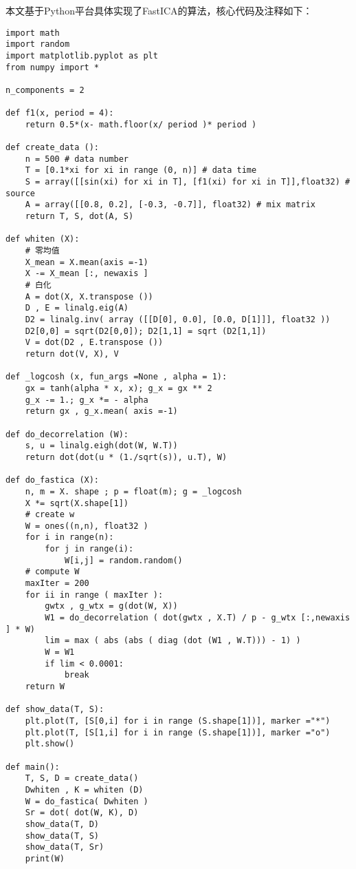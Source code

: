 本文基于Python平台具体实现了FastICA的算法，核心代码及注释如下：

\begin{verbatim}
import math
import random
import matplotlib.pyplot as plt
from numpy import *

n_components = 2

def f1(x, period = 4):
    return 0.5*(x- math.floor(x/ period )* period )

def create_data ():
    n = 500 # data number
    T = [0.1*xi for xi in range (0, n)] # data time
    S = array([[sin(xi) for xi in T], [f1(xi) for xi in T]],float32) # source
    A = array([[0.8, 0.2], [-0.3, -0.7]], float32) # mix matrix
    return T, S, dot(A, S)

def whiten (X):
    # 零均值
    X_mean = X.mean(axis =-1)
    X -= X_mean [:, newaxis ]
    # 白化
    A = dot(X, X.transpose ())
    D , E = linalg.eig(A)
    D2 = linalg.inv( array ([[D[0], 0.0], [0.0, D[1]]], float32 ))
    D2[0,0] = sqrt(D2[0,0]); D2[1,1] = sqrt (D2[1,1])
    V = dot(D2 , E.transpose ())
    return dot(V, X), V

def _logcosh (x, fun_args =None , alpha = 1):
    gx = tanh(alpha * x, x); g_x = gx ** 2
    g_x -= 1.; g_x *= - alpha
    return gx , g_x.mean( axis =-1)

def do_decorrelation (W):
    s, u = linalg.eigh(dot(W, W.T))
    return dot(dot(u * (1./sqrt(s)), u.T), W)

def do_fastica (X):
    n, m = X. shape ; p = float(m); g = _logcosh
    X *= sqrt(X.shape[1])
    # create w
    W = ones((n,n), float32 )
    for i in range(n):
        for j in range(i):
            W[i,j] = random.random()
    # compute W
    maxIter = 200
    for ii in range ( maxIter ):
        gwtx , g_wtx = g(dot(W, X))
        W1 = do_decorrelation ( dot(gwtx , X.T) / p - g_wtx [:,newaxis ] * W)
        lim = max ( abs (abs ( diag (dot (W1 , W.T))) - 1) )
        W = W1
        if lim < 0.0001:
            break
    return W

def show_data(T, S):
    plt.plot(T, [S[0,i] for i in range (S.shape[1])], marker ="*")
    plt.plot(T, [S[1,i] for i in range (S.shape[1])], marker ="o")
    plt.show()

def main():
    T, S, D = create_data()
    Dwhiten , K = whiten (D)
    W = do_fastica( Dwhiten )
    Sr = dot( dot(W, K), D)
    show_data(T, D)
    show_data(T, S)
    show_data(T, Sr)
    print(W)
\end{verbatim}